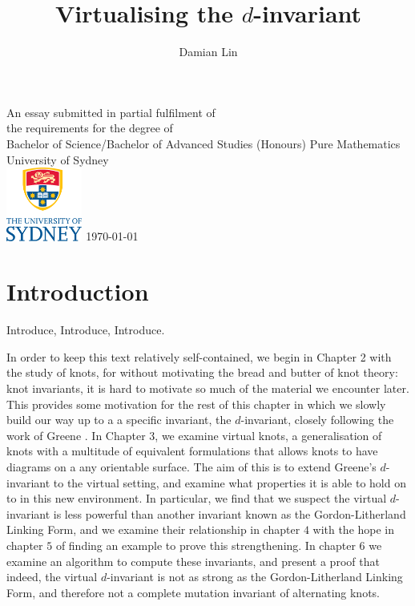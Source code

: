 \documentclass[12pt]{report}
\begin{document}
	

\author{Damian Lin}
\title{Virtualising the $d$-invariant}

\cleardoublepage \thispagestyle{empty}
\null \vfil
\begingroup
\LARGE \bfseries \centering
\openup \medskipamount
\thetitle \par \vspace{30pt}
\centering \mdseries \theauthor \par \bigskip
\endgroup
\vfil \vfil \vfil
\begin{center}
	An essay submitted in partial fulfilment of\\
	the requirements for the degree of\\
	Bachelor of Science/Bachelor of Advanced Studies (Honours)
	\vfil\vfil
	{\large Pure Mathematics\\[5pt]
		University of Sydney}\\
	\vskip6mm
	\includegraphics[width=25mm]{graphics/USY_MB1_CMYK_Stacked_Logo}
	\vfil
	\normalsize\today
\end{center}
\vfil
\cleardoublepage

\tableofcontents


\chapter*{Introduction}

Introduce, Introduce, Introduce.

In order to keep this text relatively self-contained, we begin in Chapter 2 with the study of knots, for without motivating the bread and butter of knot theory: knot invariants, it is hard to motivate so much of the material we encounter later. This provides some motivation for the rest of this chapter in which we slowly build our way up to a a specific invariant, the $d$-invariant, closely following the work of Greene \cite{lattices-graphs-mutation}. In Chapter 3, we examine virtual knots, a generalisation of knots with a multitude of equivalent formulations that allows knots to have diagrams on a any orientable surface. The aim of this is to extend Greene's $d$-invariant to the virtual setting, and examine what properties it is able to hold on to in this new environment. In particular, we find that we suspect the virtual $d$-invariant is less powerful than another invariant known as the Gordon-Litherland Linking Form, and we examine their relationship in chapter $4$ with the hope in chapter $5$ of finding an example to prove this strengthening. In chapter $6$ we examine an algorithm to compute these invariants, and present a proof that indeed, the virtual $d$-invariant is not as strong as the Gordon-Litherland Linking Form, and therefore not a complete mutation invariant of alternating knots.
\end{document}

